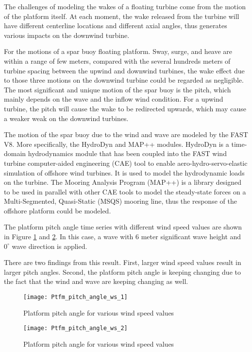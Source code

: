 \documentclass{umthesis}
\begin{document}
The challenges of modeling the wakes of a floating turbine come from the motion of the platform itself. At each moment, the wake released from the turbine will have different centerline locations and different axial angles, thus generates various impacts on the downwind turbine.

For the motions of a spar buoy floating platform. Sway, surge, and heave are within a range of few meters, compared with the several hundreds meters of turbine spacing between the upwind and downwind turbines, the wake effect due to those three motions on the downwind turbine could be regarded as negligible. The most significant and unique motion of the spar buoy is the pitch, which mainly depends on the wave and the inflow wind condition. For a upwind turbine, the pitch will cause the wake to be redirected upwards, which may cause a weaker weak on the downwind turbines. 

The motion of the spar buoy due to the wind and wave are modeled by the FAST V8. More specifically, the HydroDyn \cite{hydrodyn} and MAP++ \cite{map} modules. HydroDyn is a time-domain hydrodynamics module that has been coupled into the FAST wind turbine computer-aided engineering (CAE) tool to enable aero-hydro-servo-elastic simulation of offshore wind turbines. It is used to model the hydrodynamic loads on the turbine. The Mooring Analysis Program (MAP++) is a library designed to be used in parallel with other CAE tools to model the steady-state forces on a Multi-Segmented, Quasi-Static (MSQS) mooring line, thus the response of the offshore platform could be modeled.

The platform pitch angle time series with different wind speed values are shown in Figure \ref{fig:Ptfm_pitch_angle_ws_1} and \ref{fig:Ptfm_pitch_angle_ws_2}. In this case, a wave with 6 meter significant wave height and $0^\circ$ wave direction is applied. 

There are two findings from this result. First, larger wind speed values result in larger pitch angles. Second, the platform pitch angle is keeping changing due to the fact that the wind and wave are keeping changing as well.
 
\begin{figure}
  \centering
  \texttt{[image: Ptfm\_pitch\_angle\_ws\_1]}
  \caption{Platform pitch angle for various wind speed values}\label{fig:Ptfm_pitch_angle_ws_1}
\end{figure}

\begin{figure}
  \centering
  \texttt{[image: Ptfm\_pitch\_angle\_ws\_2]}
  \caption{Platform pitch angle for various wind speed values}\label{fig:Ptfm_pitch_angle_ws_2}
\end{figure}
\end{document}
